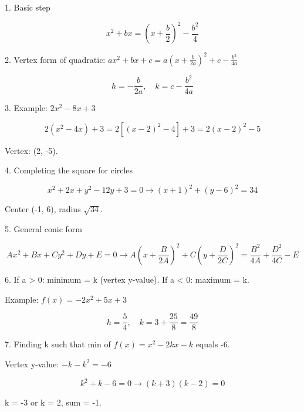 1. Basic step

$$ x^2 + bx = \left(x + \frac{b}{2}\right)^2 - \frac{b^2}{4} $$

2. Vertex form of quadratic: $ax^2 + bx + c = a\!\left(x + \frac{b}{2a}\right)^2 + c - \frac{b^2}{4a}$

$$ h = -\frac{b}{2a}, \quad k = c - \frac{b^2}{4a} $$

3. Example: $2x^2 - 8x + 3$

$$ 2(x^2-4x)+3 = 2\left[(x-2)^2-4\right]+3 = 2(x-2)^2 - 5 $$

Vertex: (2, -5).

4. Completing the square for circles

$$ x^2+2x+y^2-12y+3=0 \rightarrow (x+1)^2+(y-6)^2=34 $$

Center (-1, 6), radius $\sqrt{34}$.

5. General conic form

$$ Ax^2+Bx+Cy^2+Dy+E=0 \rightarrow A\!\left(x+\frac{B}{2A}\right)^2 + C\!\left(y+\frac{D}{2C}\right)^2 = \frac{B^2}{4A}+\frac{D^2}{4C}-E $$

6. If a > 0: minimum = k (vertex y-value). If a < 0: maximum = k.

Example: $f(x) = -2x^2 + 5x + 3$

$$ h = \frac{5}{4}, \quad k = 3 + \frac{25}{8} = \frac{49}{8} $$

7. Finding k such that min of $f(x) = x^2 - 2kx - k$ equals -6.

Vertex y-value: $-k - k^2 = -6$

$$ k^2+k-6=0 \rightarrow (k+3)(k-2)=0 $$

k = -3 or k = 2, sum = -1.
